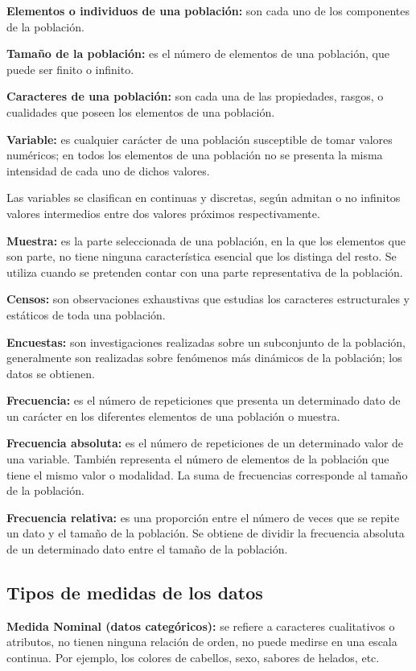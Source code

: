 \documentclass[a5paper,doc,10pt,noapacite]{apa6}
\begin{document}
{{\textbf{Elementos o individuos de una población:} son cada uno de los componentes de la población.

\textbf{Tamaño de la población:} es el número de elementos de una población, que puede ser finito o infinito.

\textbf{Caracteres de una población:} son cada una de las propiedades, rasgos, o cualidades que poseen los elementos de una población.

\textbf{Variable:} es cualquier carácter de una población susceptible de tomar valores numéricos; en todos los elementos de una población no se presenta la misma intensidad de cada uno de dichos valores.

Las variables se clasifican en continuas y discretas, según admitan o no infinitos valores intermedios entre dos valores próximos respectivamente.

\textbf{Muestra:} es la parte seleccionada de una población, en la que los elementos que son parte, no tiene ninguna característica esencial que los distinga del resto. Se utiliza cuando se pretenden contar con una parte representativa de la población.

\textbf{Censos:} son observaciones exhaustivas que estudias los caracteres estructurales y estáticos de toda una población.

\textbf{Encuestas:} son investigaciones realizadas sobre un subconjunto de la población, generalmente son realizadas sobre fenómenos más dinámicos de la población; los datos se obtienen. 

\textbf{Frecuencia:} es el número de repeticiones que presenta un determinado dato de un carácter en los diferentes elementos de una población o muestra.

\textbf{Frecuencia absoluta:} es el número de repeticiones de un determinado valor de una variable. También representa el número de elementos de la población que tiene el mismo valor o modalidad. La suma de frecuencias corresponde al tamaño de la población.

\textbf{Frecuencia relativa:} es una proporción entre el número de veces que se repite un dato y el tamaño de la población. Se obtiene de dividir la frecuencia absoluta de un determinado dato entre el tamaño de la población.  

\subsection{Tipos de medidas de los datos}

\textbf{Medida Nominal (datos categóricos):} se refiere a caracteres cualitativos o atributos, no tienen ninguna relación de orden, no puede medirse en una escala continua. Por ejemplo, los colores de cabellos, sexo, sabores de helados, etc.

}}
\end{document}
